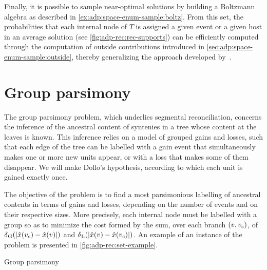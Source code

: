 Finally, it is possible to sample near-optimal solutions by building a Boltzmann algebra as described in \cref{ex:adp:space-enum-sample:boltz}.
From this set, the probabilities that each internal node of \(T\) is assigned a given event or a given host in an average solution (see \cref{fig:adp-rec:rec-supports}) can be efficiently computed through the computation of outside contributions introduced in \cref{sec:adp:space-enum-sample:outside}, thereby generalizing the approach developed by~\textcite{Nguyen2013SupportMeasuresEstimate}.

\section{Group parsimony}\label{sec:adp-rec:set}

The group parsimony problem, which underlies segmental reconciliation, concerns the inference of the ancestral content of syntenies in a tree whose content at the leaves is known.
This inference relies on a model of grouped gains and losses, such that each edge of the tree can be labelled with a gain event that simultaneously makes one or more new units appear, or with a loss that makes some of them disappear.
We will make Dollo's hypothesis, according to which each unit is gained exactly once.

The objective of the problem is to find a most parsimonious labelling of ancestral contents in terms of gains and losses, depending on the number of events and on their respective sizes.
More precisely, each internal node must be labelled with a group so as to minimize the cost formed by the sum, over each branch \((v, v_c)\), of \(\delta\kern.1pt_{\mathrm{G}}(|\hat{x}(v_c) - \hat{x}(v)|)\) and \(\delta\kern.1pt_{\mathrm{L}}(|\hat{x}(v) - \hat{x}(v_c)|)\).
An example of an instance of the problem is presented in \cref{fig:adp-rec:set-example}.

\begin{problem}{Group parsimony}
\end{problem}

